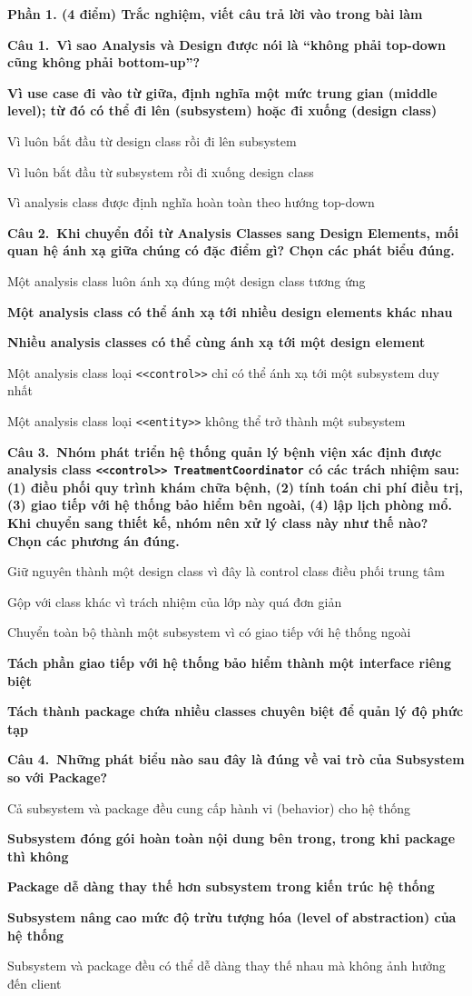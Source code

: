 \documentclass[11pt,a4paper]{article}
\newcommand{\cau}[2]{\par\vspace{2pt}\noindent\textbf{Câu #1.\ #2}\par\vspace{1pt}}
\newenvironment{pa}{\begin{list}{}{\leftmargin=0.95cm\labelwidth=0.5cm\labelsep=0.3cm\itemsep=1pt\parsep=0pt\topsep=0pt\partopsep=0pt}}{\end{list}}
\newcommand{\A}{\item[A.]}
\newcommand{\B}{\item[B.]}
\newcommand{\C}{\item[C.]}
\newcommand{\D}{\item[D.]}
\newcommand{\E}{\item[E.]}
\begin{document}
\noindent\textbf{Phần 1. (4 điểm) Trắc nghiệm, viết câu trả lời vào trong bài làm}

\cau{1}{Vì sao Analysis và Design được nói là ``không phải top-down cũng không phải bottom-up''?}
\begin{pa}
\A {\bfseries Vì use case đi vào từ giữa, định nghĩa một mức trung gian (middle level); từ đó có thể đi lên (subsystem) hoặc đi xuống (design class)}
\B Vì luôn bắt đầu từ design class rồi đi lên subsystem
\C Vì luôn bắt đầu từ subsystem rồi đi xuống design class
\D Vì analysis class được định nghĩa hoàn toàn theo hướng top-down
\end{pa}

\cau{2}{Khi chuyển đổi từ Analysis Classes sang Design Elements, mối quan hệ ánh xạ giữa chúng có đặc điểm gì? Chọn các phát biểu đúng.}
\begin{pa}
\A Một analysis class luôn ánh xạ đúng một design class tương ứng
\B {\bfseries Một analysis class có thể ánh xạ tới nhiều design elements khác nhau}
\C {\bfseries Nhiều analysis classes có thể cùng ánh xạ tới một design element}
\D Một analysis class loại \texttt{<<control>>} chỉ có thể ánh xạ tới một subsystem duy nhất
\E Một analysis class loại \texttt{<<entity>>} không thể trở thành một subsystem
\end{pa}

\cau{3}{Nhóm phát triển hệ thống quản lý bệnh viện xác định được analysis class \texttt{<<control>> TreatmentCoordinator} có các trách nhiệm sau: (1) điều phối quy trình khám chữa bệnh, (2) tính toán chi phí điều trị, (3) giao tiếp với hệ thống bảo hiểm bên ngoài, (4) lập lịch phòng mổ. Khi chuyển sang thiết kế, nhóm nên xử lý class này như thế nào? Chọn các phương án đúng.}
\begin{pa}
\A Giữ nguyên thành một design class vì đây là control class điều phối trung tâm
\B Gộp với class khác vì trách nhiệm của lớp này quá đơn giản
\C Chuyển toàn bộ thành một subsystem vì có giao tiếp với hệ thống ngoài
\D {\bfseries Tách phần giao tiếp với hệ thống bảo hiểm thành một interface riêng biệt}
\E {\bfseries Tách thành package chứa nhiều classes chuyên biệt để quản lý độ phức tạp}
\end{pa}

\cau{4}{Những phát biểu nào sau đây là đúng về vai trò của Subsystem so với Package?}
\begin{pa}
\A Cả subsystem và package đều cung cấp hành vi (behavior) cho hệ thống
\B {\bfseries Subsystem đóng gói hoàn toàn nội dung bên trong, trong khi package thì không}
\C {\bfseries Package dễ dàng thay thế hơn subsystem trong kiến trúc hệ thống}
\D {\bfseries Subsystem nâng cao mức độ trừu tượng hóa (level of abstraction) của hệ thống}
\E Subsystem và package đều có thể dễ dàng thay thế nhau mà không ảnh hưởng đến client
\end{pa}
\end{document}
